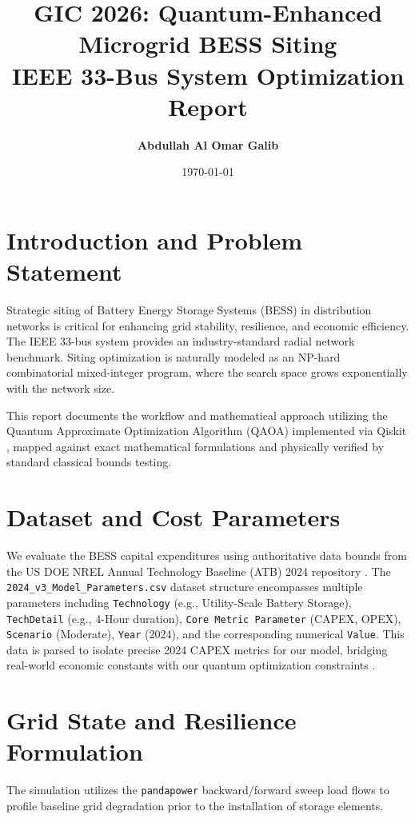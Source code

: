 \documentclass[a4paper,11pt,titlepage]{article}
\title{\Huge \textbf{GIC 2026: Quantum-Enhanced Microgrid BESS Siting} \\
\Large IEEE 33-Bus System Optimization Report}
\author{\textbf{Abdullah Al Omar Galib}}
\date{\today}
\begin{document}
\maketitle
\thispagestyle{empty}
\newpage

\tableofcontents
\listoffigures
\newpage

\section{Introduction and Problem Statement}
Strategic siting of Battery Energy Storage Systems (BESS) in distribution networks is critical for enhancing grid stability, resilience, and economic efficiency. The IEEE 33-bus system \cite{baran1989network} provides an industry-standard radial network benchmark. Siting optimization is naturally modeled as an NP-hard combinatorial mixed-integer program, where the search space grows exponentially with the network size.

This report documents the workflow and mathematical approach utilizing the Quantum Approximate Optimization Algorithm (QAOA) \cite{farhi2014quantum} implemented via Qiskit \cite{qiskit2023}, mapped against exact mathematical formulations and physically verified by standard classical bounds testing.

\section{Dataset and Cost Parameters}
We evaluate the BESS capital expenditures using authoritative data bounds from the US DOE NREL Annual Technology Baseline (ATB) 2024 repository \cite{mirletz2024atb}. The \texttt{2024\_v3\_Model\_Parameters.csv} dataset structure encompasses multiple parameters including \texttt{Technology} (e.g., Utility-Scale Battery Storage), \texttt{TechDetail} (e.g., 4-Hour duration), \texttt{Core Metric Parameter} (CAPEX, OPEX), \texttt{Scenario} (Moderate), \texttt{Year} (2024), and the corresponding numerical \texttt{Value}. This data is parsed to isolate precise 2024 CAPEX metrics for our model, bridging real-world economic constants with our quantum optimization constraints \cite{farhi2014quantum}.

\section{Grid State and Resilience Formulation}
The simulation utilizes the \texttt{pandapower} \cite{thurner2018pandapower} backward/forward sweep load flows to profile baseline grid degradation prior to the installation of storage elements.
\end{document}
